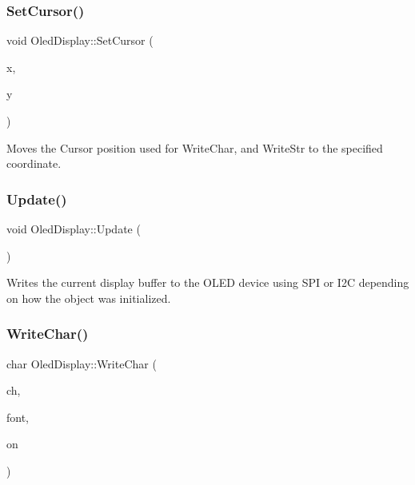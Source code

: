\subsubsection{\texorpdfstring{Set\+Cursor()}{SetCursor()}}
{\footnotesize\ttfamily void Oled\+Display\+::\+Set\+Cursor (\begin{DoxyParamCaption}\item[{uint8\+\_\+t}]{x,  }\item[{uint8\+\_\+t}]{y }\end{DoxyParamCaption})}

Moves the \textquotesingle{}Cursor\textquotesingle{} position used for Write\+Char, and Write\+Str to the specified coordinate. \mbox{\label{classdaisy_1_1_oled_display_ae7785a2e9ebe3e5a6b10ef76f3db6035}} 
\subsubsection{\texorpdfstring{Update()}{Update()}}
{\footnotesize\ttfamily void Oled\+Display\+::\+Update (\begin{DoxyParamCaption}\item[{void}]{ }\end{DoxyParamCaption})}

Writes the current display buffer to the O\+L\+ED device using S\+PI or I2C depending on how the object was initialized. \mbox{\label{classdaisy_1_1_oled_display_a05bb991cd0329a27c736d63b131ee774}} 
\subsubsection{\texorpdfstring{Write\+Char()}{WriteChar()}}
{\footnotesize\ttfamily char Oled\+Display\+::\+Write\+Char (\begin{DoxyParamCaption}\item[{char}]{ch,  }\item[{\hyperlink{struct_font_def}{Font\+Def}}]{font,  }\item[{bool}]{on }\end{DoxyParamCaption})}

